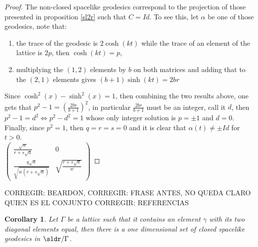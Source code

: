\documentclass[11pt]{amsart}
\theoremstyle{plain}
\newtheorem{cor}[thm]{Corollary}
\theoremstyle{definition}
\theoremstyle{remark}
\begin{document}
\begin{proof}
The non-closed spacelike geodesics correspond to the projection of those presented in proposition \ref{sl2r} such that $C=Id$. To see this, let $\alpha$ be one of those geodesics, note  that:
\begin{enumerate}
    \item the trace of the geodesic is $2 \cosh{(k t)}$ while the trace of an element of the lattice is $2p$, then $\cosh{(kt)}=p$,
    \item multiplying the $(1,2)$ elements by $b$ on both matrices and adding that to the $(2,1)$ elements gives $(b+1)\sinh{(kt)}=2 b r$
\end{enumerate}
Since $\cosh^2(x)-\sinh^2(x)=1$, then combining the two results above, one gets that $p^2-1=(\frac{2 b r}{b+1})^2$, in particular $\frac{2 b r}{b+1}$ must be an integer, call it $d$, then $p^2-1=d^2 \iff p^2-d^2=1$ whose only integer solution is $p=\pm 1$ and $d=0$. Finally, since $p^2=1$, then $q=r=s=0$ and it is clear that $\alpha(t) \neq \pm Id$ for $t>0$.\\

$\begin{pmatrix}
   \frac{\sqrt{w}}{r+s \sqrt{a}} & 0 \\[6pt]
   \frac{q \sqrt{a}}{\sqrt{w(r+s\sqrt{a})}} & \sqrt{\frac{r+s\sqrt{a}}{w}}
\end{pmatrix}$
\end{proof}







CORREGIR: BEARDON, 
CORREGIR: FRASE ANTES, NO QUEDA CLARO QUIEN ES EL CONJUNTO
CORREGIR: REFERENCIAS

\begin{cor}
Let $\Gamma$ be a lattice such that it contains an element $\gamma$ with its two diagonal elements equal, then there is a one dimensional set of closed spacelike geodesics in $\sldr / \Gamma$. 
\end{cor}
\end{document}
